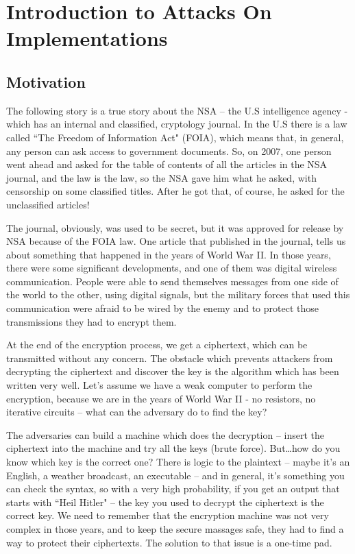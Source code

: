 \chapter{Introduction to Attacks On Implementations}
\label{chap:c1_IntroductionAOI}

\section{Motivation} %
\label{sec:Motivation}

The following story is a true story about the NSA – the U.S intelligence agency -  which has an internal and classified, cryptology journal. In the U.S there is a law called ``The Freedom of Information Act" (FOIA), which means that, in general, any person can ask access to government documents. So, on 2007, one person went ahead and asked for the table of contents of all the articles in the NSA journal, and the law is the law, so the NSA gave him what he asked, with censorship on some classified titles. After he got that, of course, he asked for the unclassified articles!

The journal, obviously, was used to be secret, but it was approved for release by NSA because of the FOIA law. One article that published in the journal, tells us about something that happened in the years of World War II. In those years, there were some significant developments, and one of them was digital wireless communication. People were able to send themselves messages from one side of the world to the other, using digital signals, but the military forces that used this communication were afraid to be wired by the enemy and to protect those transmissions they had to encrypt them.    

At the end of the encryption process, we get a ciphertext, which can be transmitted without any concern. The obstacle which prevents attackers from decrypting the ciphertext and discover the key is the algorithm which has been written very well.  
Let's assume we have a weak computer to perform the encryption, because we are in the years of World War II -  no resistors, no iterative circuits – what can the adversary do to find the key?

The adversaries can build a machine which does the decryption – insert the ciphertext into the machine and try all the keys (brute force). But\ldots how do you know which key is the correct one? There is logic to the plaintext – maybe it's an English, a weather broadcast, an executable – and in general, it's something you can check the syntax, so with a very high probability, if you get an output that starts with ``Heil Hitler" – the key you used to decrypt the ciphertext is the correct key. We need to remember that the encryption machine was not very complex in those years, and to keep the secure massages safe, they had to find a way to protect their ciphertexts. The solution to that issue is a one-time pad.

